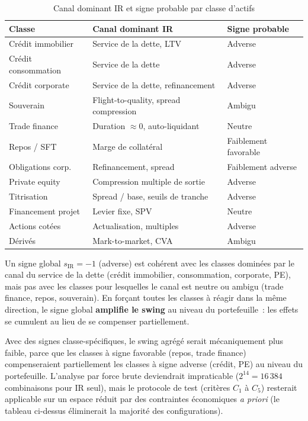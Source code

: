 \documentclass[12pt, a4paper, twoside, openright]{report}
\theoremstyle{definition}
\begin{document}
\begin{table}[htbp]
\centering
\caption{Canal dominant IR et signe probable par classe d'actifs}
\label{tab:signe-classe}
\begin{tabular}{lll}
\toprule
\textbf{Classe} & \textbf{Canal dominant IR} & \textbf{Signe probable} \\
\midrule
Crédit immobilier   & Service de la dette, LTV              & Adverse \\
Crédit consommation & Service de la dette                   & Adverse \\
Crédit corporate    & Service de la dette, refinancement    & Adverse \\
Souverain           & Flight-to-quality, spread compression & Ambigu \\
Trade finance       & Duration $\approx 0$, auto-liquidant  & Neutre \\
Repos / SFT         & Marge de collatéral                   & Faiblement favorable \\
Obligations corp.   & Refinancement, spread                 & Faiblement adverse \\
Private equity      & Compression multiple de sortie        & Adverse \\
Titrisation         & Spread / base, seuils de tranche      & Adverse \\
Financement projet  & Levier fixe, SPV                      & Neutre \\
Actions cotées      & Actualisation, multiples              & Adverse \\
Dérivés             & Mark-to-market, CVA                   & Ambigu \\
\bottomrule
\end{tabular}
\end{table}

Un signe global $s_{\text{IR}} = -1$ (adverse) est cohérent avec les classes dominées par le canal du service de la dette (crédit immobilier, consommation, corporate, PE), mais pas avec les classes pour lesquelles le canal est neutre ou ambigu (trade finance, repos, souverain). En forçant toutes les classes à réagir dans la même direction, le signe global \textbf{amplifie le swing} au niveau du portefeuille~: les effets se cumulent au lieu de se compenser partiellement.

Avec des signes classe-spécifiques, le swing agrégé serait mécaniquement plus faible, parce que les classes à signe favorable (repos, trade finance) compenseraient partiellement les classes à signe adverse (crédit, PE) au niveau du portefeuille. L'analyse par force brute deviendrait impraticable ($2^{14} = 16\,384$ combinaisons pour IR seul), mais le protocole de test (critères $C_1$ à $C_5$) resterait applicable sur un espace réduit par des contraintes économiques \textit{a priori} (le tableau ci-dessus éliminerait la majorité des configurations).
\end{document}
